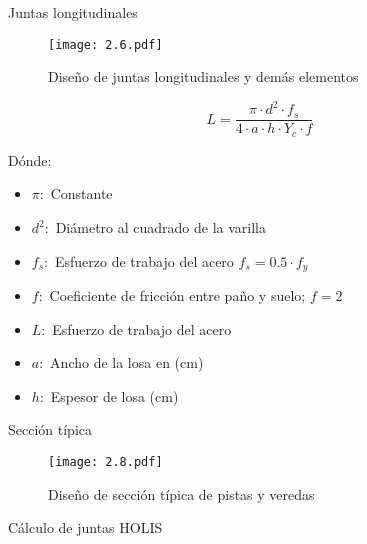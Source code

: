 \begin{frame}{Juntas longitudinales}
	\begin{figure}[h]
	\captionsetup{width=1\textwidth}
	\centering
	\texttt{[image: 2.6.pdf]}
	\caption[Descripcion corta]{Diseño de juntas longitudinales y demás elementos }
	\label{fig:etiqueta}
	\end{figure}
\end{frame}
\begin{frame}
	\begin{equation}
		L = \frac{\pi \cdot d^{2} \cdot f_{s}}{4 \cdot a \cdot h \cdot Y_{c} \cdot f}
	\end{equation}
	\begin{block}{Dónde:}
		\begin{itemize}
			\item \(\pi : \) Constante
			\item \(d^{2} : \) Diámetro al cuadrado de la varilla
			\item \(f_{s} :\) Esfuerzo de trabajo del acero \(f_{s} =0.5 \cdot f_{y}\)
			\item \(f :\) Coeficiente de fricción entre paño y suelo; \(f = 2\)
			\item \(L :\) Esfuerzo de trabajo del acero
			\item \(a :\) Ancho de la losa en (cm)
			\item \(h :\) Espesor de losa (cm)
		\end{itemize}
	\end{block}
\end{frame}


\begin{frame}{Sección típica}
	\begin{figure}[h]
	\captionsetup{width=1\textwidth}
	\centering
	\texttt{[image: 2.8.pdf]}
	\caption[Descripcion corta]{Diseño de sección típica de pistas y veredas }
	\label{fig:etiqueta}
	\end{figure}
\end{frame}

\begin{frame}{Cálculo de juntas}
	HOLIS
\end{frame}
